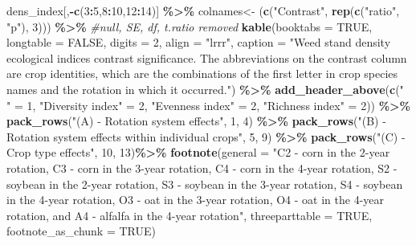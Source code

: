 \documentclass[
]{article}
\newenvironment{Shaded}{\begin{snugshade}}{\end{snugshade}}
\newcommand{\AttributeTok}[1]{\textcolor[rgb]{0.13,0.29,0.53}{#1}}
\newcommand{\CommentTok}[1]{\textcolor[rgb]{0.56,0.35,0.01}{\textit{#1}}}
\newcommand{\ConstantTok}[1]{\textcolor[rgb]{0.56,0.35,0.01}{#1}}
\newcommand{\DecValTok}[1]{\textcolor[rgb]{0.00,0.00,0.81}{#1}}
\newcommand{\FunctionTok}[1]{\textcolor[rgb]{0.13,0.29,0.53}{\textbf{#1}}}
\newcommand{\NormalTok}[1]{#1}
\newcommand{\OtherTok}[1]{\textcolor[rgb]{0.56,0.35,0.01}{#1}}
\newcommand{\SpecialCharTok}[1]{\textcolor[rgb]{0.81,0.36,0.00}{\textbf{#1}}}
\newcommand{\StringTok}[1]{\textcolor[rgb]{0.31,0.60,0.02}{#1}}
\begin{document}
\begin{Shaded}
\begin{Highlighting}[]
\NormalTok{dens\_index[,}\SpecialCharTok{{-}}\FunctionTok{c}\NormalTok{(}\DecValTok{3}\SpecialCharTok{:}\DecValTok{5}\NormalTok{,}\DecValTok{8}\SpecialCharTok{:}\DecValTok{10}\NormalTok{,}\DecValTok{12}\SpecialCharTok{:}\DecValTok{14}\NormalTok{)] }\SpecialCharTok{\%\textgreater{}\%}  
  \StringTok{\textasciigrave{}}\AttributeTok{colnames\textless{}{-}}\StringTok{\textasciigrave{}}\NormalTok{ (}\FunctionTok{c}\NormalTok{(}\StringTok{"Contrast"}\NormalTok{, }\FunctionTok{rep}\NormalTok{(}\FunctionTok{c}\NormalTok{(}\StringTok{"ratio"}\NormalTok{, }\StringTok{"p"}\NormalTok{), }\DecValTok{3}\NormalTok{))) }\SpecialCharTok{\%\textgreater{}\%} \CommentTok{\#null, SE, df, t.ratio removed}
\FunctionTok{kable}\NormalTok{(}\AttributeTok{booktabs =} \ConstantTok{TRUE}\NormalTok{, }\AttributeTok{longtable =} \ConstantTok{FALSE}\NormalTok{, }\AttributeTok{digits =} \DecValTok{2}\NormalTok{, }\AttributeTok{align =} \StringTok{"lrrr"}\NormalTok{,}
    \AttributeTok{caption =} \StringTok{"Weed stand density ecological indices contrast significance. The abbreviations on the contrast column are crop identities, which are the combinations of the first letter in crop species names and the rotation in which it occurred."}\NormalTok{) }\SpecialCharTok{\%\textgreater{}\%}
   \FunctionTok{add\_header\_above}\NormalTok{(}\FunctionTok{c}\NormalTok{(}\StringTok{" "} \OtherTok{=} \DecValTok{1}\NormalTok{, }\StringTok{"Diversity index"} \OtherTok{=} \DecValTok{2}\NormalTok{, }\StringTok{"Evenness index"} \OtherTok{=} \DecValTok{2}\NormalTok{, }\StringTok{"Richness index"} \OtherTok{=} \DecValTok{2}\NormalTok{))  }\SpecialCharTok{\%\textgreater{}\%}
  \FunctionTok{pack\_rows}\NormalTok{(}\StringTok{"(A) {-} Rotation system effects"}\NormalTok{, }\DecValTok{1}\NormalTok{, }\DecValTok{4}\NormalTok{) }\SpecialCharTok{\%\textgreater{}\%}
  \FunctionTok{pack\_rows}\NormalTok{(}\StringTok{"(B) {-} Rotation system effects within individual crops"}\NormalTok{, }\DecValTok{5}\NormalTok{, }\DecValTok{9}\NormalTok{) }\SpecialCharTok{\%\textgreater{}\%}
  \FunctionTok{pack\_rows}\NormalTok{(}\StringTok{"(C) {-} Crop type effects"}\NormalTok{, }\DecValTok{10}\NormalTok{, }\DecValTok{13}\NormalTok{)}\SpecialCharTok{\%\textgreater{}\%}
  \FunctionTok{footnote}\NormalTok{(}\AttributeTok{general =} \StringTok{"C2 {-} corn in the 2{-}year rotation, C3 {-} corn in the 3{-}year rotation, C4 {-} corn in the 4{-}year rotation, S2 {-} soybean in the 2{-}year rotation, S3 {-} soybean in the 3{-}year rotation, S4 {-} soybean in the 4{-}year rotation, O3 {-} oat in the 3{-}year rotation, O4 {-} oat in the 4{-}year rotation, and A4 {-} alfalfa in the 4{-}year rotation"}\NormalTok{, }\AttributeTok{threeparttable =} \ConstantTok{TRUE}\NormalTok{, }\AttributeTok{footnote\_as\_chunk =} \ConstantTok{TRUE}\NormalTok{)}
\end{Highlighting}
\end{Shaded}
\end{document}
